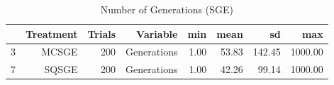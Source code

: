 \begin{table}[ht]
\centering
\begin{tabular}{rrrrrrrr}
  \hline
 & Treatment & Trials & Variable & min & mean & sd & max \\ 
  \hline
3 & MCSGE & 200 & Generations & 1.00 & 53.83 & 142.45 & 1000.00 \\ 
  7 & SQSGE & 200 & Generations & 1.00 & 42.26 & 99.14 & 1000.00 \\ 
   \hline
\end{tabular}
\caption{Number of Generations (SGE)} 
\end{table}
